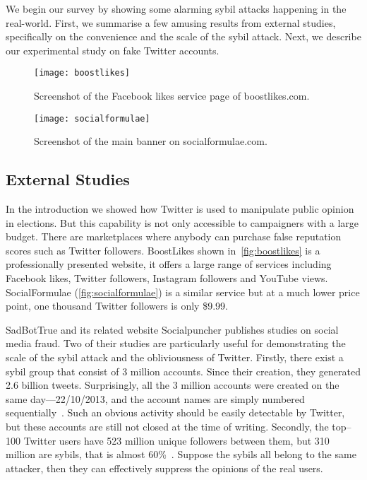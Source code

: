 We begin our survey by showing some alarming sybil attacks happening in the
real-world. First, we summarise a few amusing results from external studies,
specifically on the convenience and the scale of the sybil attack. Next, we
describe our experimental study on fake Twitter accounts.

\begin{figure}
  \centering
  \texttt{[image: boostlikes]}
  \caption{Screenshot of the Facebook likes service page of boostlikes.com.}
  \label{fig:boostlikes}
\end{figure}

\begin{figure*}
  \centering
  \texttt{[image: socialformulae]}
  \caption{Screenshot of the main banner on socialformulae.com.}
  \label{fig:socialformulae}
\end{figure*}

\subsection{External Studies}
\label{sec:external-studies}

In the introduction we showed how Twitter is used to manipulate public opinion
in elections. But this capability is not only accessible to campaigners with a
large budget. There are marketplaces where anybody can purchase false reputation
scores such as Twitter followers. BoostLikes shown in~\autoref{fig:boostlikes}
is a professionally presented website, it offers a large range of services
including Facebook likes, Twitter followers, Instagram followers and YouTube
views. SocialFormulae (\autoref{fig:socialformulae}) is a similar service but at
a much lower price point, one thousand Twitter followers is only \$9.99. 

SadBotTrue and its related website Socialpuncher publishes studies on social
media fraud. Two of their studies are particularly useful for demonstrating the
scale of the sybil attack and the obliviousness of Twitter. Firstly, there exist
a sybil group that consist of 3 million accounts. Since their creation, they
generated 2.6 billion tweets. Surprisingly, all the 3 million accounts were
created on the same day---22/10/2013, and the account names are simply numbered
sequentially~\cite{sadbottrue}. Such an obvious activity should be easily
detectable by Twitter, but these accounts are still not closed at the time of
writing. Secondly, the top--100 Twitter users have 523 million unique followers
between them, but 310 million are sybils, that is almost
60\%~\cite{socialpuncher}. Suppose the sybils all belong to the same attacker,
then they can effectively suppress the opinions of the real users.


